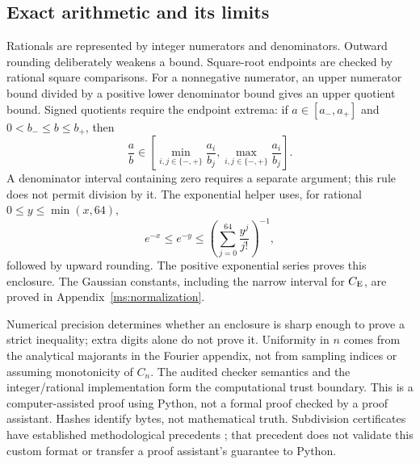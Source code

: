 \subsection{Exact arithmetic and its limits}
Rationals are represented by integer numerators and denominators.
Outward rounding deliberately weakens a bound. Square-root endpoints
are checked by rational square comparisons. For a nonnegative numerator,
an upper numerator bound divided by a positive lower denominator bound
gives an upper quotient bound. Signed quotients require the endpoint
extrema: if $a\in[a_-,a_+]$ and $0<b_-\le b\le b_+$, then
\[
 \frac ab\in
 \left[\min_{i,j\in\{-,+\}}\frac{a_i}{b_j},
       \max_{i,j\in\{-,+\}}\frac{a_i}{b_j}\right].
\]
A denominator interval containing zero requires a separate argument;
this rule does not permit division by it. The exponential
helper uses, for rational $0\le y\le\min(x,64)$,
\[
 e^{-x}\le e^{-y}\le
 \left(\sum_{j=0}^{64}\frac{y^j}{j!}\right)^{-1},
\]
followed by upward rounding. The positive exponential series proves
this enclosure. The Gaussian constants, including the narrow interval
for $C_{\mathrm E}$, are proved in Appendix~\ref{ms:normalization}.

Numerical precision determines whether an enclosure is sharp enough to
prove a strict inequality; extra digits alone do not prove it.
Uniformity in $n$ comes from the analytical majorants in the Fourier
appendix, not from sampling indices or assuming monotonicity of $C_n$.
The audited checker semantics and the integer/rational implementation
form the computational trust boundary. This is a computer-assisted
proof using Python, not a formal proof checked by a proof assistant.
Hashes identify bytes, not mathematical truth.
Subdivision certificates have established methodological precedents
\cite{SolovyevHales2013}; that precedent does not validate this custom
format or transfer a proof assistant's guarantee to Python.

